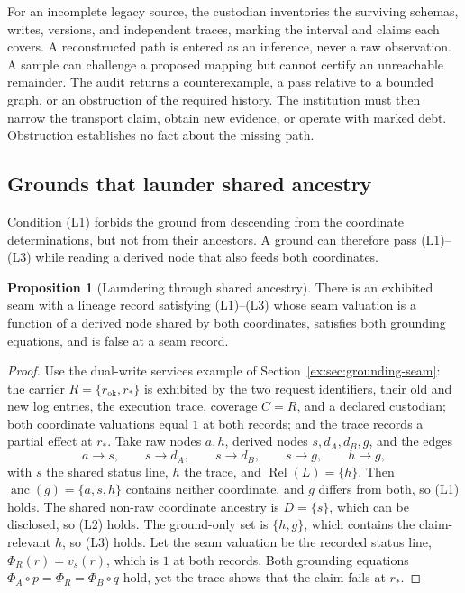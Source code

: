 \documentclass[11pt]{article}
\theoremstyle{definition}
\newtheorem{proposition}{Proposition}[section]
\begin{document}
For an incomplete legacy source, the custodian inventories the surviving schemas, writes, versions, and independent traces, marking the interval and claims each covers. A reconstructed path is entered as an inference, never a raw observation. A sample can challenge a proposed mapping but cannot certify an unreachable remainder. The audit returns a counterexample, a pass relative to a bounded graph, or an obstruction of the required history. The institution must then narrow the transport claim, obtain new evidence, or operate with marked debt. Obstruction establishes no fact about the missing path.

\subsection{Grounds that launder shared ancestry}\label{ex:sec:laundering}

Condition (L1) forbids the ground from descending from the coordinate determinations, but not from their ancestors. A ground can therefore pass (L1)--(L3) while reading a derived node that also feeds both coordinates.

\begin{proposition}[Laundering through shared ancestry]\label{ex:prop:laundering}
There is an exhibited seam with a lineage record satisfying (L1)--(L3) whose seam valuation is a function of a derived node shared by both coordinates, satisfies both grounding equations, and is false at a seam record.
\end{proposition}
\begin{proof}
Use the dual-write services example of Section~\ref{ex:sec:grounding-seam}: the carrier $R=\{r_{\mathrm{ok}},r_*\}$ is exhibited by the two request identifiers, their old and new log entries, the execution trace, coverage $C=R$, and a declared custodian; both coordinate valuations equal $1$ at both records; and the trace records a partial effect at $r_*$. Take raw nodes $a,h$, derived nodes $s,d_A,d_B,g$, and the edges
\[
a\to s,\qquad s\to d_A,\qquad s\to d_B,\qquad s\to g,\qquad h\to g,
\]
with $s$ the shared status line, $h$ the trace, and $\operatorname{Rel}(L)=\{h\}$. Then $\operatorname{anc}(g)=\{a,s,h\}$ contains neither coordinate, and $g$ differs from both, so (L1) holds. The shared non-raw coordinate ancestry is $D=\{s\}$, which can be disclosed, so (L2) holds. The ground-only set is $\{h,g\}$, which contains the claim-relevant $h$, so (L3) holds. Let the seam valuation be the recorded status line, $\Phi_R(r)=v_s(r)$, which is $1$ at both records. Both grounding equations $\Phi_A\circ p=\Phi_R=\Phi_B\circ q$ hold, yet the trace shows that the claim fails at $r_*$.
\end{proof}
\end{document}
